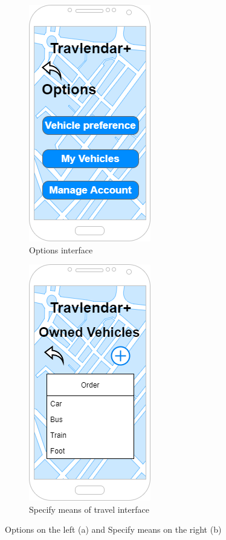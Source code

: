 \begin{figure}[h]
\centering
\begin{subfigure}{.5\textwidth}
  \centering
  \includegraphics[height=.4\textheight, keepaspectratio=true]{Img/Options}
  \caption{Options interface}
\end{subfigure}%
\begin{subfigure}{.5\textwidth}
  \centering
  \includegraphics[height=.4\textheight, keepaspectratio=true]{Img/SpecifyMeans}
  \caption{Specify means of travel interface}
\end{subfigure}
\caption{Options on the left (a) and Specify means on the right (b)}
\end{figure}

